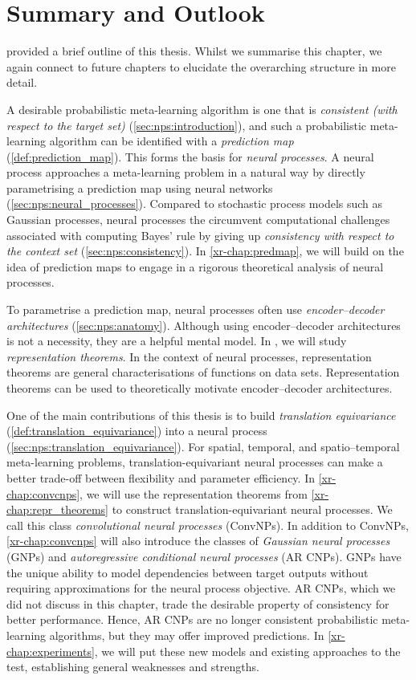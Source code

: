 \documentclass[12pt, twoside]{report}
\newcommand{\xrprefix}[1]{xr-#1}
\begin{document}
\section{Summary and Outlook}

\Cref{\xrprefix{sec:introduction:overview}} provided a brief outline of this thesis.
Whilst we summarise this chapter, we again connect to future chapters to elucidate the overarching structure in more detail.

A desirable 
probabilistic meta-learning algorithm is one that is \emph{consistent (with respect to the target set)} (\cref{sec:nps:introduction}),
and such a probabilistic meta-learning algorithm can be identified with a \emph{prediction map} (\cref{def:prediction_map}).
This forms the basis for \emph{neural processes}.
A neural process
approaches a meta-learning problem
in a natural way
by directly parametrising a prediction map using neural networks (\cref{sec:nps:neural_processes}).
Compared to stochastic process models such as Gaussian processes, neural processes the circumvent computational challenges associated with computing Bayes' rule by giving up \emph{consistency with respect to the context set} (\cref{sec:nps:consistency}).
In \cref{\xrprefix{chap:predmap}}, we will build on the idea of prediction maps to engage in a rigorous theoretical analysis of neural processes.

To parametrise a prediction map, neural processes often use \emph{encoder--decoder architectures} (\cref{sec:nps:anatomy}).
Although using encoder--decoder architectures is not a necessity, they are a helpful mental model.
In \Cref{\xrprefix{chap:repr_theorems}}, we will study \emph{representation theorems}.
In the context of neural processes, representation theorems are general characterisations of functions on data sets.
Representation theorems can be used to 
theoretically motivate encoder--decoder architectures.

One of the main contributions of this thesis is to build \emph{translation equivariance} (\cref{def:translation_equivariance}) into a neural process (\cref{sec:nps:translation_equivariance}).
For spatial, temporal, and spatio--temporal meta-learning problems, translation-equivariant neural processes can make a better trade-off between flexibility and parameter efficiency.
In \cref{\xrprefix{chap:convcnps}}, we will use the representation theorems from \cref{\xrprefix{chap:repr_theorems}} to construct translation-equivariant neural processes.
We call this class \emph{convolutional neural processes} (ConvNPs).
In addition to ConvNPs,
\cref{\xrprefix{chap:convcnps}} will also introduce the classes of \emph{Gaussian neural processes} (GNPs)
and \emph{autoregressive conditional neural processes} (AR CNPs).
GNPs have the unique ability to model dependencies between target outputs without requiring approximations for the neural process objective.
AR CNPs, which we did not discuss in this chapter, trade the desirable property of consistency for better performance.
Hence, AR CNPs are no longer consistent probabilistic meta-learning algorithms, but they may offer improved predictions.
In \cref{\xrprefix{chap:experiments}}, we will put these new models and existing approaches to the test, establishing general weaknesses and strengths.
\end{document}
